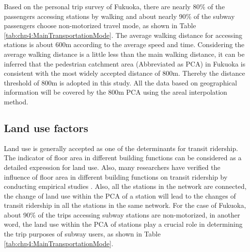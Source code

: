 %
Based on the personal trip survey of Fukuoka, there are nearly 80\% of the passengers accessing stations by walking and about nearly 90\% of the subway passengers choose non-motorized travel mode, as shown in Table \ref{tab:chp4:MainTransportationMode}. The average walking distance for accessing stations is about 600m according to the average speed and time. Considering the average walking distance is a little less than the main walking distance, it can be inferred that the pedestrian catchment area (Abbreviated as PCA) in Fukuoka is consistent with the most widely accepted distance of 800m. Thereby the distance threshold of 800m is adopted in this study. All the data based on geographical information will be covered by the 800m PCA using the areal interpolation method.

%
\subsection{Land use factors}
%
Land use is generally accepted as one of the determinants for transit ridership. The indicator of floor area in different building functions can be considered as a detailed expression for land use. Also, many researchers have verified the influence of floor area in different building functions on transit ridership by conducting empirical studies \cite{sohn2010factors,gutierrez2011transit,chakraborty2013land,chakraborty2013land,jun2015land}. Also, all the stations in the network are connected, the change of land use within the PCA of a station will lead to the changes of transit ridership in all the stations in the same network. For the case of Fukuoka, about 90\% of the trips accessing subway stations are non-motorized, in another word, the land use within the PCA of stations play a crucial role in determining the trip purposes of subway users, as shown in Table \ref{tab:chp4:MainTransportationMode}.

